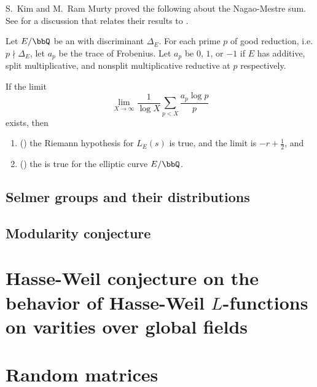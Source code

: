S.~Kim and M.~Ram Murty\cite{kim_murty_bsdcnsc} proved the following about the Nagao-Mestre sum. See \cite[Section 4]{kim_murty_bsdcnsc} for a discussion that relates their results to .
\begin{theorem}
    Let $E/\bbQ$ be an  with discriminant $\Delta_E$. For each prime $p$ of good reduction, i.e. $p \nmid \Delta_E$,  let $a_p$ be the trace of Frobenius. Let $a_p$ be $0$, $1$, or $-1$ if $E$ has additive, split multiplicative, and nonsplit multiplicative reductive at $p$ respectively.

    If the limit 
        $$\lim_{X \to \infty} \frac{1}{\log X} \sum_{p < X} \frac{a_p \log p}{p}$$ 
    exists, then 
    \begin{enumerate}
        \item ({\cite[Corollary 7]{kim_murty_bsdcnsc}}) the Riemann hypothesis for $L_E(s)$ is true, and the limit is $-r + \frac{1}{2}$, and 
        \item ({\cite[Corollary 8]{kim_murty_bsdcnsc}}) the  is true for the elliptic curve $E/\bbQ$.
    \end{enumerate}
\end{theorem}


\subsection{Selmer groups and their distributions}

\subsection{Modularity conjecture}

\section{Hasse-Weil conjecture on the behavior of Hasse-Weil \texorpdfstring{$L$}{L}-functions on varities over global fields}





\section{Random matrices}

